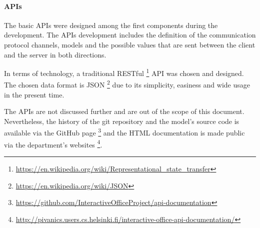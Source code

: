\paragraph{APIs}
The basic APIs were designed among the first components during the development. The APIs development includes the definition of the communication protocol channels, models and the possible values that are sent between the client and the server in both directions. 

In terms of technology, a traditional RESTful \footnote{\url{https://en.wikipedia.org/wiki/Representational\_state\_transfer}} API was chosen and designed. The chosen data format is JSON \footnote{\url{https://en.wikipedia.org/wiki/JSON}} due to its simplicity, easiness and wide usage in the present time. 

The APIs are not discussed further and are out of the scope of this document. Nevertheless, the history of the git repository and the model's source code is available via the GitHub page \footnote{\url{https://github.com/InteractiveOfficeProject/api-documentation}} and the HTML documentation is made public via the department's websites \footnote{\url{http://pivanics.users.cs.helsinki.fi/interactive-office-api-documentation/}}. 